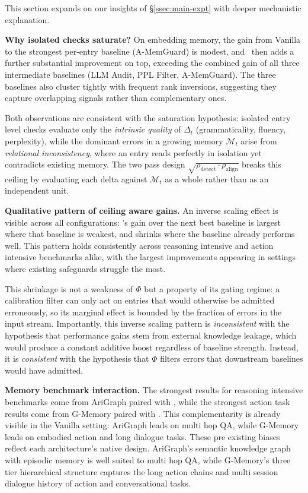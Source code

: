 This section expands on our insights of \S\ref{ssec:main-expt} with deeper mechanistic explanation.

\textbf{Why isolated checks saturate?} 
On embedding memory, the gain from Vanilla to the strongest per-entry baseline (A-MemGuard) is modest, and \system\ then adds a further substantial improvement on top, exceeding the combined gain of all three intermediate baselines (LLM Audit, PPL Filter, A-MemGuard). The three baselines also cluster tightly with frequent rank inversions, suggesting they capture overlapping signals rather than complementary ones.

Both observations are consistent with the saturation hypothesis: isolated entry level checks evaluate only the \emph{intrinsic quality} of $\Delta_t$ (grammaticality, fluency, perplexity), while the dominant errors in a growing memory $\mathcal{M}_t$ arise from \emph{relational inconsistency}, where an entry reads perfectly in isolation yet contradicts existing memory. The two pass design $\sqrt{\rho_{\text{detect}} \cdot \rho_{\text{align}}}$ breaks this ceiling by evaluating each delta against $\mathcal{M}_t$ as a whole rather than as an independent unit.

\textbf{Qualitative pattern of ceiling aware gains.} 
An inverse scaling effect is visible across all configurations: \system's gain over the next best baseline is largest where that baseline is weakest, and shrinks where the baseline already performs well. This pattern holds consistently across reasoning intensive and action intensive benchmarks alike, with the largest improvements appearing in settings where existing safeguards struggle the most.

This shrinkage is not a weakness of $\Phi$ but a property of its gating regime: a calibration filter can only act on entries that would otherwise be admitted erroneously, so its marginal effect is bounded by the fraction of errors in the input stream. Importantly, this inverse scaling pattern is \emph{inconsistent} with the hypothesis that performance gains stem from external knowledge leakage, which would produce a constant additive boost regardless of baseline strength. Instead, it is \emph{consistent} with the hypothesis that $\Phi$ filters errors that downstream baselines would have admitted.

\textbf{Memory benchmark interaction.} 
The strongest results for reasoning intensive benchmarks come from AriGraph paired with \system, while the strongest action task results come from G-Memory paired with \system. This complementarity is already visible in the Vanilla setting: AriGraph leads on multi hop QA, while G-Memory leads on embodied action and long dialogue tasks. These pre existing biases reflect each architecture's native design. AriGraph's semantic knowledge graph with episodic memory is well suited to multi hop QA, while G-Memory's three tier hierarchical structure captures the long action chains and multi session dialogue history of action and conversational tasks.

